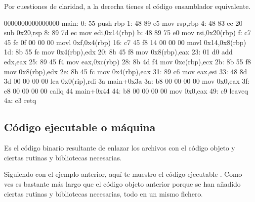 \documentclass[letterpaper,10pt,spanish]{sphinxmanual}
\begin{document}
\sphinxAtStartPar
Por cuestiones de claridad, a la derecha tienes el código ensamblador equivalente.
\def\sphinxLiteralBlockLabel{\label{\detokenize{obtencion_del_codigo:id3}}}
\begin{sphinxVerbatim}[commandchars=\\\{\}]
0000000000000000 \PYGZlt{}main\PYGZgt{}:
0:  55                      push   \PYGZpc{}rbp
1:  48 89 e5                mov    \PYGZpc{}rsp,\PYGZpc{}rbp
4:  48 83 ec 20             sub    \PYGZdl{}0x20,\PYGZpc{}rsp
8:  89 7d ec                mov    \PYGZpc{}edi,\PYGZhy{}0x14(\PYGZpc{}rbp)
b:  48 89 75 e0             mov    \PYGZpc{}rsi,\PYGZhy{}0x20(\PYGZpc{}rbp)
f:  c7 45 fc 0f 00 00 00    movl   \PYGZdl{}0xf,\PYGZhy{}0x4(\PYGZpc{}rbp)
16: c7 45 f8 14 00 00 00    movl   \PYGZdl{}0x14,\PYGZhy{}0x8(\PYGZpc{}rbp)
1d: 8b 55 fc                mov    \PYGZhy{}0x4(\PYGZpc{}rbp),\PYGZpc{}edx
20: 8b 45 f8                mov    \PYGZhy{}0x8(\PYGZpc{}rbp),\PYGZpc{}eax
23: 01 d0                   add    \PYGZpc{}edx,\PYGZpc{}eax
25: 89 45 f4                mov    \PYGZpc{}eax,\PYGZhy{}0xc(\PYGZpc{}rbp)
28: 8b 4d f4                mov    \PYGZhy{}0xc(\PYGZpc{}rbp),\PYGZpc{}ecx
2b: 8b 55 f8                mov    \PYGZhy{}0x8(\PYGZpc{}rbp),\PYGZpc{}edx
2e: 8b 45 fc                mov    \PYGZhy{}0x4(\PYGZpc{}rbp),\PYGZpc{}eax
31: 89 c6                   mov    \PYGZpc{}eax,\PYGZpc{}esi
33: 48 8d 3d 00 00 00 00    lea    0x0(\PYGZpc{}rip),\PYGZpc{}rdi        \PYGZsh{} 3a \PYGZlt{}main+0x3a\PYGZgt{}
3a: b8 00 00 00 00          mov    \PYGZdl{}0x0,\PYGZpc{}eax
3f: e8 00 00 00 00          callq  44 \PYGZlt{}main+0x44\PYGZgt{}
44: b8 00 00 00 00          mov    \PYGZdl{}0x0,\PYGZpc{}eax
49: c9                      leaveq
4a: c3                      retq
\end{sphinxVerbatim}


\subsection{Código ejecutable o máquina}
\label{\detokenize{obtencion_del_codigo:codigo-ejecutable-o-maquina}}
\sphinxAtStartPar
Es el código binario resultante de enlazar los archivos con el código objeto y ciertas rutinas y bibliotecas necesarias.

\sphinxAtStartPar
Siguiendo con el ejemplo anterior, aquí te muestro el código ejecutable . Como ves es bastante más largo que el código objeto anterior porque se han añadido ciertas rutinas y bibliotecas necesarias, todo en un mismo fichero.
\end{document}
